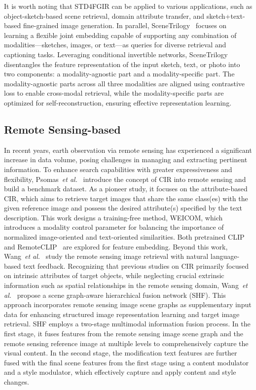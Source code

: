 It is worth noting that STD4FGIR can be applied to various applications, such as object-sketch-based scene retrieval, domain attribute transfer, and sketch+text-based fine-grained image generation. In parallel, SceneTrilogy~\cite{SceneTrilogy} focuses on learning a flexible joint embedding capable of supporting any combination of modalities—sketches, images, or text—as queries for diverse retrieval and captioning tasks. Leveraging conditional invertible networks, SceneTrilogy disentangles the feature representation of the input sketch, text, or photo into two components: a modality-agnostic part and a modality-specific part. The modality-agnostic parts across all three modalities are aligned using contrastive loss to enable cross-modal retrieval, while the modality-specific parts are optimized for self-reconstruction, ensuring effective representation learning.

\subsection{Remote Sensing-based} 
In recent years, earth observation via remote sensing has experienced a significant increase in data volume, posing challenges in managing and extracting pertinent information. To enhance search capabilities with greater expressiveness and flexibility, Psomas~\textit{et al.}~\cite{weicom} introduce the concept of CIR into remote sensing and build a benchmark dataset. As a pioneer study, it focuses on the attribute-based CIR, which aims to retrieve target images that share the same class(es) with the given reference image and possess the desired attribute(s) specified by the text description. This work designs a training-free method, WEICOM, which introduces a modality control parameter for balancing the importance of normalized image-oriented and text-oriented similarities. Both pretrained CLIP and RemoteCLIP~\cite{liu2024remoteclip} are explored for feature embedding. Beyond this work, Wang~\textit{et al.}~\cite{shf} study the remote sensing image retrieval with natural language-based text feedback. Recognizing that previous studies on CIR primarily focused on intrinsic attributes of target objects, while neglecting crucial extrinsic information such as spatial relationships in the remote sensing domain, Wang~\textit{et al.}~\cite{shf} propose a scene graph-aware hierarchical fusion network (SHF). This approach incorporates remote sensing image scene graphs as supplementary input data for enhancing structured image representation learning and target image retrieval. SHF employs a two-stage multimodal information fusion process. In the first stage, it fuses features from the remote sensing image scene graph and the remote sensing reference image at multiple levels to comprehensively capture the visual content. In the second stage, the modification text features are further fused with the final scene features from the first stage using a content modulator and a style modulator, which effectively capture and apply content and style changes.

